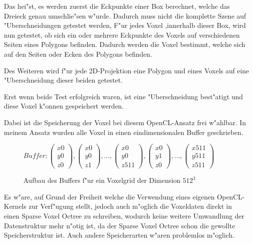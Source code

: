 \documentclass[a4paper, 12pt]{scrartcl}
\begin{document}
Das hei"st, es werden zuerst die Eckpunkte einer Box berechnet, welche das Dreieck genau umschlie"sen w"urde. Dadurch muss nicht die komplette Szene auf "Uberschneidungen getestet werden, 
F"ur jedes Voxel ,innerhalb dieser Box, wird nun getestet, ob sich ein oder mehrere Eckpunkte des Voxels auf verschiedenen Seiten eines Polygons befinden. Dadurch werden die Voxel bestimmt, welche sich auf den Seiten oder Ecken des Polygons befinden.

Des Weiteren wird f"ur jede 2D-Projektion eine Polygon und eines Voxels auf eine "Uberschneidung dieser beiden getestet.

Erst wenn beide Test erfolgreich waren, ist eine "Uberschneidung best"atigt und diese Voxel k"onnen gespeichert werden.

Dabei ist die Speicherung der Voxel bei diesem OpenCL-Ansatz frei w"ahlbar. 
In meinem Ansatz wurden alle Voxel in einen eindimensionalen Buffer geschrieben. 

\begin{figure}[h]
	\centering
		$Buffer: \begin{pmatrix}x0 \\ y0 \\ z0 \end{pmatrix}, \begin{pmatrix}x0 \\ y0 \\ z1 \end{pmatrix}, ..., \begin{pmatrix}x0 \\ y0 \\ z511 \end{pmatrix}, \begin{pmatrix}x0 \\ y1 \\ z0 	\end{pmatrix}, ..., \begin{pmatrix}x511 \\ y511 \\ z511 \end{pmatrix}$
	\caption{Aufbau des Buffers f"ur ein Voxelgrid der Dimension $512^3$}
\end{figure}

Es w"are, auf Grund der Freiheit welche die Verwendung eines eigenen OpenCL-Kernels zur Verf"ugung stellt, jedoch auch m"oglich die Voxeldaten direkt in einen Sparse Voxel Octree zu schreiben, wodurch keine weitere Umwandlung der Datenstruktur mehr n"otig ist, da der Sparse Voxel Octree schon die gewollte Speicherstruktur ist. Auch andere Speicherarten w"aren problemlos m"oglich.
\end{document}
